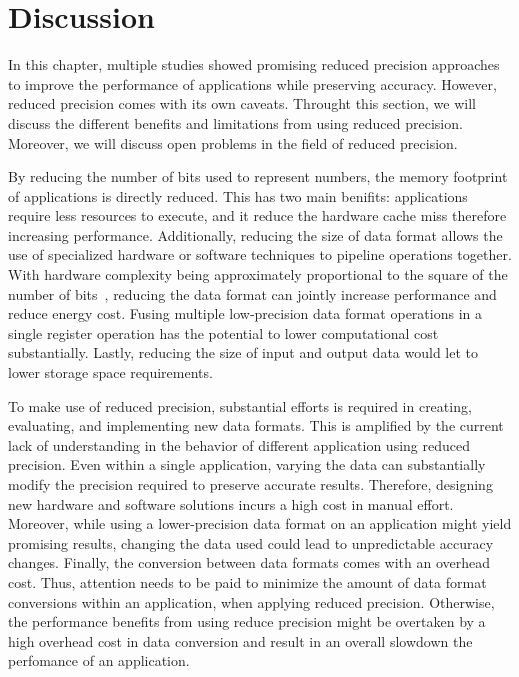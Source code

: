 \section{Discussion}
In this chapter, multiple studies showed promising reduced precision approaches
to improve the performance of applications while preserving accuracy.
However, reduced precision comes with its own caveats.
Throught this section, we will discuss the different benefits and limitations from
using reduced precision.
Moreover, we will discuss open problems in the field of reduced precision.

By reducing the number of bits used to represent numbers, the memory footprint
of applications is directly reduced.
This has two main benifits: applications require less resources to execute, and 
it reduce the hardware cache miss therefore increasing performance.
Additionally, reducing the size of data format allows the use of specialized hardware
or software techniques to pipeline operations together.
With hardware complexity being approximately proportional to the square of the 
number of bits~\cite{Chen2018-an}, reducing the data format can jointly increase
performance and reduce energy cost.
Fusing multiple low-precision data format operations in a single register operation 
has the potential to lower computational cost substantially.
Lastly, reducing the size of input and output data would let to lower storage space requirements.

To make use of reduced precision, substantial efforts is required in creating, 
evaluating, and implementing new data formats.
This is amplified by the current lack of understanding in the 
behavior of different application using reduced precision.
Even within a single application, varying the data can substantially modify the 
precision required to preserve accurate results.
Therefore, designing new hardware and software solutions incurs a high cost in manual effort.
Moreover, while using a lower-precision data format on an application might yield 
promising results, changing the data used could lead to unpredictable accuracy changes.
Finally, the conversion between data formats comes with an overhead cost.
Thus, attention needs to be paid to minimize the amount of data format conversions 
within an application, when applying reduced precision.
Otherwise, the performance benefits from using reduce precision might be overtaken
by a high overhead cost in data conversion and result in an overall slowdown 
the perfomance of an application.

